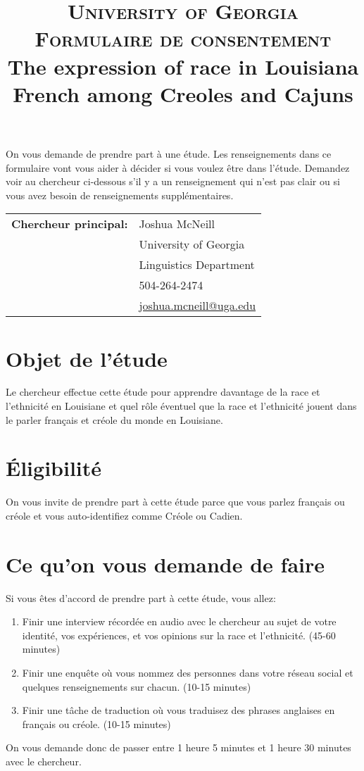 \documentclass{article}
\title{\textsc{
           University of Georgia \\
           Formulaire de consentement \\
         }
         The expression of race in Louisiana French among Creoles and Cajuns}
\date{}
\newcommand{\tabhead}[1]{\textbf{#1}}
\begin{document}
    \maketitle
    On vous demande de prendre part à une étude.
    Les renseignements dans ce formulaire vont vous aider à décider si vous voulez être dans l'étude.
    Demandez voir au chercheur ci-dessous s'il y a un renseignement qui n'est pas clair ou si vous avez besoin de renseignements supplémentaires.
    \begin{center}
      \begin{tabular}{l l}
        \tabhead{Chercheur principal:} & Joshua McNeill \\
                                       & University of Georgia \\
                                       & Linguistics Department \\
                                       & 504-264-2474 \\
                                       & \href{mailto:joshua.mcneill@uga.edu}{joshua.mcneill@uga.edu}
      \end{tabular}
    \end{center}

    \section{Objet de l'étude}
      Le chercheur effectue cette étude pour apprendre davantage de la race et l'ethnicité en Louisiane et quel rôle éventuel que la race et l'ethnicité jouent dans le parler français et créole du monde en Louisiane.

    \section{Éligibilité}
      On vous invite de prendre part à cette étude parce que vous parlez français ou créole et vous auto-identifiez comme Créole ou Cadien.

    \section{Ce qu'on vous demande de faire}
      Si vous êtes d'accord de prendre part à cette étude, vous allez:
      \begin{enumerate}
        \item Finir une interview récordée en audio avec le chercheur au sujet de votre identité, vos expériences, et vos opinions sur la race et l'ethnicité. (45-60 minutes)
        \item Finir une enquête où vous nommez des personnes dans votre réseau social et quelques renseignements sur chacun. (10-15 minutes)
        \item Finir une tâche de traduction où vous traduisez des phrases anglaises en français ou créole. (10-15 minutes)
      \end{enumerate}
      On vous demande donc de passer entre 1 heure 5 minutes et 1 heure 30 minutes avec le chercheur.
\end{document}
